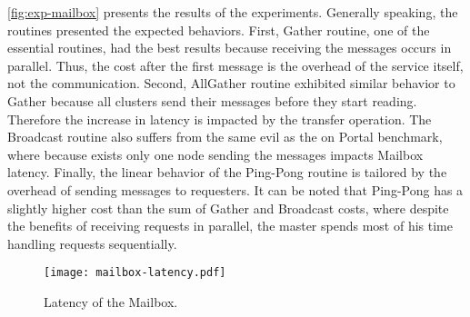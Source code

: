 		\autoref{fig:exp-mailbox} presents the results of the experiments.
		Generally speaking, the routines presented the expected behaviors.
		First, Gather routine, one of the essential routines, had the best
		results because receiving the messages occurs in parallel. Thus,
		the cost after the first message is the overhead of the service
		itself, not the communication. Second, AllGather routine exhibited
		similar behavior to Gather because all clusters send their messages
		before they start reading. Therefore the increase in latency is
		impacted by the transfer operation. The Broadcast routine also
		suffers from the same evil as the on Portal benchmark, where because
		exists only one node sending the messages impacts Mailbox latency.
		Finally, the linear behavior of the Ping-Pong routine is tailored
		by the overhead of sending messages to requesters. It can be noted
		that Ping-Pong has a slightly higher cost than the sum of Gather
		and Broadcast costs, where despite the benefits of receiving
		requests in parallel, the master spends most of his time handling
		requests sequentially.

		\begin{figure}[!tb]
			\centering%
			\caption{Latency of the Mailbox.}%
			\label{fig:exp-mailbox}%
			\texttt{[image: mailbox-latency.pdf]}%
		\end{figure}

